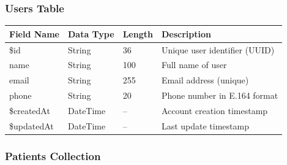 \documentclass[11pt,a4paper]{article}
\begin{document}
\subsubsection{Users Table}

\begin{longtable}{|p{3cm}|p{2.5cm}|p{1.5cm}|p{6cm}|}
\hline
\textbf{Field Name} & \textbf{Data Type} & \textbf{Length} & \textbf{Description} \\
\hline
\$id & String & 36 & Unique user identifier (UUID) \\
name & String & 100 & Full name of user \\
email & String & 255 & Email address (unique) \\
phone & String & 20 & Phone number in E.164 format \\
\$createdAt & DateTime & -- & Account creation timestamp \\
\$updatedAt & DateTime & -- & Last update timestamp \\
\hline
\end{longtable}

\subsubsection{Patients Collection}
\end{document}
